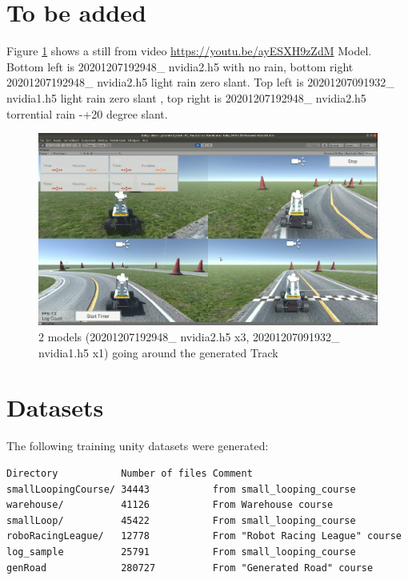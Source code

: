 \section{To be added}

Figure  \ref{fig:2948x3_1932x1_genTrack}  shows a still from video \url{https://youtu.be/ayESXH9zZdM} Model.
Bottom left is 20201207192948\_ nvidia2.h5 with no rain, bottom right 20201207192948\_ nvidia2.h5 light rain zero slant. Top left is 20201207091932\_ nvidia1.h5 light rain zero slant , top right is 20201207192948\_ nvidia2.h5 torrential rain -+20 degree slant.

\begin{figure}[ht]
 \centering 
 \includegraphics[width=\textwidth]{Figures/2948x3_1932x1_genTrack.png}
 \caption{2 models (20201207192948\_ nvidia2.h5 x3, 20201207091932\_ nvidia1.h5 x1) going around the generated Track}
 \label{fig:2948x3_1932x1_genTrack} 
\end{figure}



\section{Datasets}

The following training unity datasets were generated:
\begin{verbatim}
Directory           Number of files Comment
smallLoopingCourse/ 34443           from small_looping_course
warehouse/          41126           From Warehouse course
smallLoop/          45422           From small_looping_course
roboRacingLeague/   12778           From "Robot Racing League" course
log_sample          25791           From small_looping_course
genRoad             280727          From "Generated Road" course
\end{verbatim}


